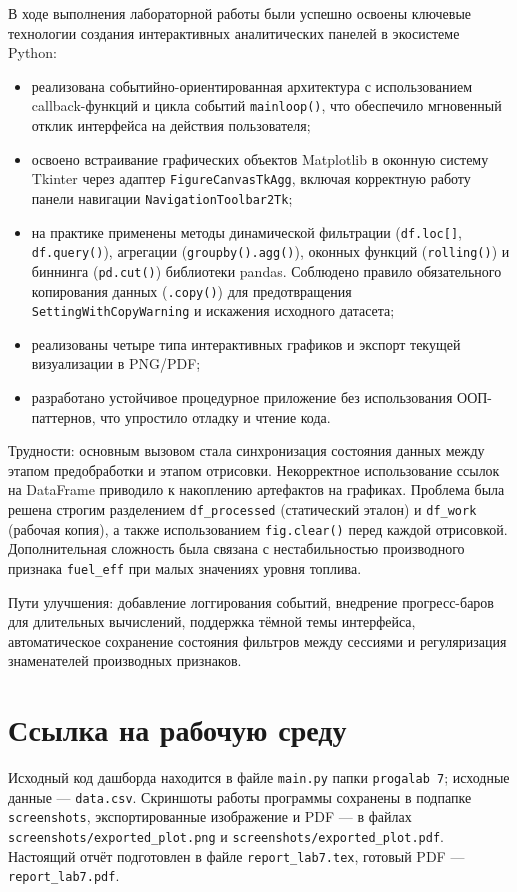 \documentclass[oneside,a4paper,14pt]{extarticle}
\begin{document}
В ходе выполнения лабораторной работы были успешно освоены ключевые технологии создания интерактивных аналитических панелей в экосистеме Python:
\begin{itemize}[leftmargin=*]
	\item реализована событийно-ориентированная архитектура с использованием callback-функций и цикла событий \texttt{mainloop()}, что обеспечило мгновенный отклик интерфейса на действия пользователя;
	\item освоено встраивание графических объектов Matplotlib в оконную систему Tkinter через адаптер \texttt{FigureCanvasTkAgg}, включая корректную работу панели навигации \texttt{NavigationToolbar2Tk};
	\item на практике применены методы динамической фильтрации (\texttt{df.loc[]}, \texttt{df.query()}), агрегации (\texttt{groupby().agg()}), оконных функций (\texttt{rolling()}) и биннинга (\texttt{pd.cut()}) библиотеки pandas. Соблюдено правило обязательного копирования данных (\texttt{.copy()}) для предотвращения \texttt{SettingWithCopyWarning} и искажения исходного датасета;
	\item реализованы четыре типа интерактивных графиков и экспорт текущей визуализации в PNG/PDF;
	\item разработано устойчивое процедурное приложение без использования ООП-паттернов, что упростило отладку и чтение кода.
\end{itemize}

Трудности: основным вызовом стала синхронизация состояния данных между этапом предобработки и этапом отрисовки. Некорректное использование ссылок на DataFrame приводило к накоплению артефактов на графиках. Проблема была решена строгим разделением \texttt{df\_processed} (статический эталон) и \texttt{df\_work} (рабочая копия), а также использованием \texttt{fig.clear()} перед каждой отрисовкой. Дополнительная сложность была связана с нестабильностью производного признака \texttt{fuel\_eff} при малых значениях уровня топлива.

Пути улучшения: добавление логгирования событий, внедрение прогресс-баров для длительных вычислений, поддержка тёмной темы интерфейса, автоматическое сохранение состояния фильтров между сессиями и регуляризация знаменателей производных признаков.

\section{Ссылка на рабочую среду}

Исходный код дашборда находится в файле \texttt{main.py} папки \texttt{progalab 7}; исходные данные --- \texttt{data.csv}. Скриншоты работы программы сохранены в подпапке \texttt{screenshots}, экспортированные изображение и PDF --- в файлах \texttt{screenshots/exported\_plot.png} и \texttt{screenshots/exported\_plot.pdf}. Настоящий отчёт подготовлен в файле \texttt{report\_lab7.tex}, готовый PDF --- \texttt{report\_lab7.pdf}.
\end{document}
